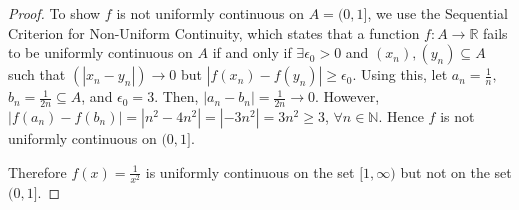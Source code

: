 \documentclass[10pt]{article}
\theoremstyle{definition}
\begin{document}
\begin{enumerate}
\begin{proof}
To show $f$ is not uniformly continuous on $A = (0,1]$, we use the Sequential Criterion for Non-Uniform Continuity, which states that a function $f: A \rightarrow \mathbb{R}$ fails to be uniformly continuous on $A$ if and only if $\exists \epsilon_0 > 0$ and $(x_n), (y_n) \subseteq A$ such that $(|x_n-y_n|) \rightarrow 0$ but $|f(x_n) - f(y_n)| \geq \epsilon_0$.  Using this, let $a_n = \frac{1}{n}, $ $b_n=\frac{1}{2n} \subseteq A$, and $\epsilon_0 = 3$.  Then, $|a_n-b_n|=\frac{1}{2n} \rightarrow 0$.  However, $|f(a_n) - f(b_n)| = |n^2-4n^2|=|-3n^2| = 3n^2 \geq 3$, $\forall n \in \mathbb{N}$.  Hence $f$ is not uniformly continuous on $(0,1]$.

Therefore $f(x) = \frac{1}{x^2}$ is uniformly continuous on the set $[1,\infty)$ but not on the set $(0,1]$.

\end{proof}
	

\end{enumerate}
\end{document}
